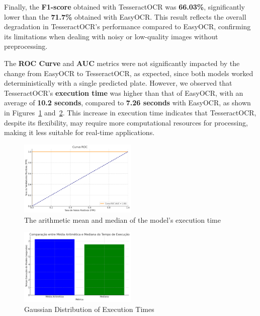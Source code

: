 \documentclass[conference]{IEEEtran}
\begin{document}
    Finally, the \textbf{F1-score} obtained with TesseractOCR was \textbf{66.03\%}, significantly lower than the \textbf{71.7\%} obtained with EasyOCR. This result reflects the overall degradation in TesseractOCR's performance compared to EasyOCR, confirming its limitations when dealing with noisy or low-quality images without preprocessing.
    
    The \textbf{ROC Curve} and \textbf{AUC} metrics were not significantly impacted by the change from EasyOCR to TesseractOCR, as expected, since both models worked deterministically with a single predicted plate. However, we observed that TesseractOCR's \textbf{execution time} was higher than that of EasyOCR, with an average of \textbf{10.2 seconds}, compared to \textbf{7.26 seconds} with EasyOCR, as shown in Figures~\ref{img16} and~\ref{img17}. This increase in execution time indicates that TesseractOCR, despite its flexibility, may require more computational resources for processing, making it less suitable for real-time applications.
    
    \begin{figure}[htbp]
        \centerline{\includegraphics[width=0.5\textwidth]{img16.png}}
        \caption{The arithmetic mean and median of the model's execution time}
        \label{img16}
    \end{figure}
    
    \begin{figure}[htbp]
        \centerline{\includegraphics[width=0.5\textwidth]{img17.png}}
        \caption{Gaussian Distribution of Execution Times}
        \label{img17}
    \end{figure}
    
\end{document}
